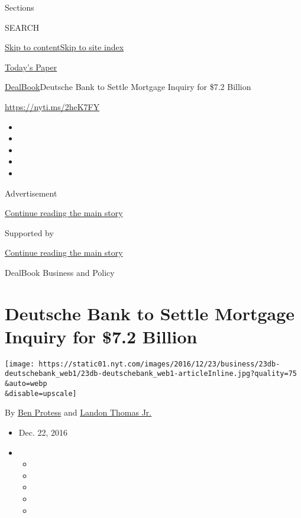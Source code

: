 Sections

SEARCH

\protect\hyperlink{site-content}{Skip to
content}\protect\hyperlink{site-index}{Skip to site index}

\href{https://myaccount.nytimes.com/auth/login?response_type=cookie\&client_id=vi}{}

\href{https://www.nytimes.com/section/todayspaper}{Today's Paper}

\href{/section/business/dealbook}{DealBook}\textbar{}Deutsche Bank to
Settle Mortgage Inquiry for \$7.2 Billion

\url{https://nyti.ms/2heK7FY}

\begin{itemize}
\item
\item
\item
\item
\item
\end{itemize}

Advertisement

\protect\hyperlink{after-top}{Continue reading the main story}

Supported by

\protect\hyperlink{after-sponsor}{Continue reading the main story}

DealBook Business and Policy

\hypertarget{deutsche-bank-to-settle-mortgage-inquiry-for-72-billion}{%
\section{Deutsche Bank to Settle Mortgage Inquiry for \$7.2
Billion}\label{deutsche-bank-to-settle-mortgage-inquiry-for-72-billion}}

\texttt{[image: https://static01.nyt.com/images/2016/12/23/business/23db-deutschebank\_web1/23db-deutschebank\_web1-articleInline.jpg?quality=75\\\&auto=webp\\\&disable=upscale]}

By \href{http://www.nytimes.com/by/ben-protess}{Ben Protess} and
\href{http://www.nytimes.com/by/landon-thomas-jr}{Landon Thomas Jr.}

\begin{itemize}
\item
  Dec. 22, 2016
\item
  \begin{itemize}
  \item
  \item
  \item
  \item
  \item
  \end{itemize}
\end{itemize}

